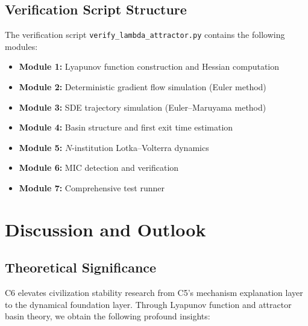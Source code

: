 \documentclass[12pt,a4paper]{article}
\theoremstyle{definition}
\begin{document}
\subsection{Verification Script Structure}
\label{sec:verify_script}

\noindent
The verification script \texttt{verify\_lambda\_attractor.py} contains the following modules:
\begin{itemize}
    \item \textbf{Module 1:} Lyapunov function construction and Hessian computation
    \item \textbf{Module 2:} Deterministic gradient flow simulation (Euler method)
    \item \textbf{Module 3:} SDE trajectory simulation (Euler--Maruyama method)
    \item \textbf{Module 4:} Basin structure and first exit time estimation
    \item \textbf{Module 5:} $N$-institution Lotka--Volterra dynamics
    \item \textbf{Module 6:} MIC detection and verification
    \item \textbf{Module 7:} Comprehensive test runner
\end{itemize}

\section{Discussion and Outlook}
\label{sec:discussion}

\subsection{Theoretical Significance}
\label{sec:significance}

\noindent
C6 elevates civilization stability research from C5's mechanism explanation layer to the dynamical foundation layer. Through Lyapunov function and attractor basin theory, we obtain the following profound insights:
\end{document}
